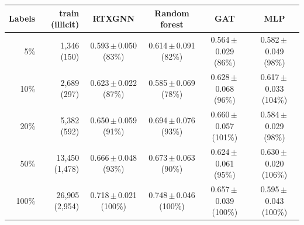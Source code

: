 \begin{tabular}{rrcccc}
\toprule
Labels & train (illicit) & RTXGNN & Random forest & GAT & MLP\\
\midrule
5\% & 1,346 (150) & 0.593\,$\pm$\,0.050 (83\%) & 0.614\,$\pm$\,0.091 (82\%) & 0.564\,$\pm$\,0.029 (86\%) & 0.582\,$\pm$\,0.049 (98\%)\\
10\% & 2,689 (297) & 0.623\,$\pm$\,0.022 (87\%) & 0.585\,$\pm$\,0.069 (78\%) & 0.628\,$\pm$\,0.068 (96\%) & 0.617\,$\pm$\,0.033 (104\%)\\
20\% & 5,382 (592) & 0.650\,$\pm$\,0.059 (91\%) & 0.694\,$\pm$\,0.076 (93\%) & 0.660\,$\pm$\,0.057 (101\%) & 0.584\,$\pm$\,0.029 (98\%)\\
50\% & 13,450 (1,478) & 0.666\,$\pm$\,0.048 (93\%) & 0.673\,$\pm$\,0.063 (90\%) & 0.624\,$\pm$\,0.061 (95\%) & 0.630\,$\pm$\,0.020 (106\%)\\
100\% & 26,905 (2,954) & 0.718\,$\pm$\,0.021 (100\%) & 0.748\,$\pm$\,0.046 (100\%) & 0.657\,$\pm$\,0.039 (100\%) & 0.595\,$\pm$\,0.043 (100\%)\\
\bottomrule
\end{tabular}
